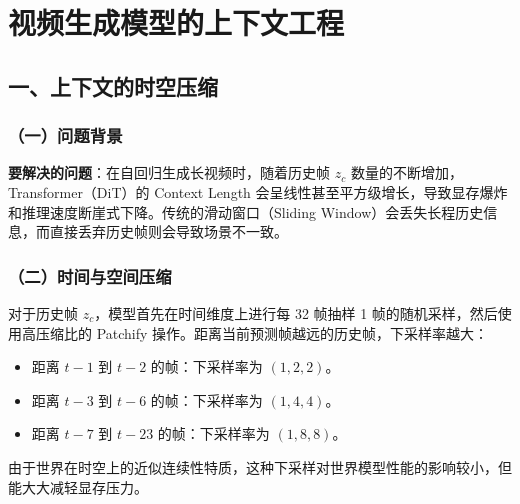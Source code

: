 \clearpage

\hypertarget{ux89c6ux9891ux751fux6210ux6a21ux578bux7684ux4e0aux4e0bux6587ux5de5ux7a0b}{%
\section{视频生成模型的上下文工程}\label{ux89c6ux9891ux751fux6210ux6a21ux578bux7684ux4e0aux4e0bux6587ux5de5ux7a0b}}

\hypertarget{ux4e00ux4e0aux4e0bux6587ux7684ux65f6ux7a7aux538bux7f29}{%
\subsection{一、上下文的时空压缩}\label{ux4e00ux4e0aux4e0bux6587ux7684ux65f6ux7a7aux538bux7f29}}

\hypertarget{ux4e00ux95eeux9898ux80ccux666f-5}{%
\subsubsection{（一）问题背景}\label{ux4e00ux95eeux9898ux80ccux666f-5}}

\textbf{要解决的问题}：在自回归生成长视频时，随着历史帧 \(z_c\) 数量的不断增加，Transformer（DiT）的 Context Length 会呈线性甚至平方级增长，导致显存爆炸和推理速度断崖式下降。传统的滑动窗口（Sliding Window）会丢失长程历史信息，而直接丢弃历史帧则会导致场景不一致。

\hypertarget{ux4e8cux65f6ux95f4ux4e0eux7a7aux95f4ux538bux7f29}{%
\subsubsection{（二）时间与空间压缩}\label{ux4e8cux65f6ux95f4ux4e0eux7a7aux95f4ux538bux7f29}}

对于历史帧 \(z_c\)，模型首先在时间维度上进行每 32 帧抽样 1 帧的随机采样，然后使用高压缩比的 Patchify 操作。距离当前预测帧越远的历史帧，下采样率越大：

\begin{itemize}
\tightlist
\item
  距离 \(t-1\) 到 \(t-2\) 的帧：下采样率为 \((1,2,2)\)。
\item
  距离 \(t-3\) 到 \(t-6\) 的帧：下采样率为 \((1,4,4)\)。
\item
  距离 \(t-7\) 到 \(t-23\) 的帧：下采样率为 \((1,8,8)\)。
\end{itemize}

由于世界在时空上的近似连续性特质，这种下采样对世界模型性能的影响较小，但能大大减轻显存压力。

